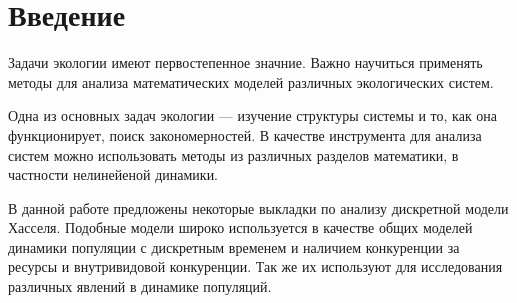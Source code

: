 \section{Введение}

    Задачи экологии имеют первостепенное значние. Важно научиться применять методы для анализа математических моделей различных экологических систем. 
    
    Одна из основных задач экологии --- изучение структуры системы и то, как она функционирует, поиск закономерностей. В качестве инструмента для анализа систем можно использовать методы из различных разделов математики, в частности нелинейеной динамики.
    
    В данной работе предложены некоторые выкладки по анализу дискретной модели Хасселя. Подобные модели широко используется в качестве общих моделей динамики популяции с дискретным временем и наличием конкуренции за ресурсы и внутривидовой конкуренции. Так же их используют для исследования различных явлений в динамике популяций.






    